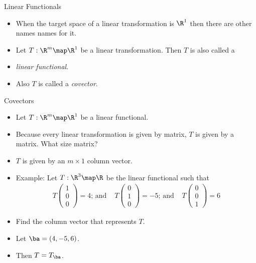 \documentclass{beamer}
\begin{document}
\begin{frame}{Linear Functionals}
\begin{itemize}
\item When the target space of a linear transformation is $\R^1$ then there
are other names names for it.
\item Let $T:\R^m\map\R^1$ be a linear transformation. Then $T$ is also called a
\item \emph{linear functional}.
\item Also $T$ is called a \emph{covector}.
\end{itemize}
\end{frame}


\begin{frame}{Covectors}
\begin{itemize}
\item Let $T:\R^m\map\R^1$ be a linear functional.
\item Because every linear transformation is given by matrix, $T$ is given
by a matrix. What size matrix?
\item $T$ is given by an $m\times 1$ column vector.
\item Example: Let $T:\R^3\map\R$ be the linear functional such that
$$
\begin{matrix}
T\begin{pmatrix} 1 \\ 0 \\ 0  \end{pmatrix} = 4
\text{; and }
&
T\begin{pmatrix} 0 \\ 1 \\ 0  \end{pmatrix} = -5
\text{; and }
&
T \begin{pmatrix} 0 \\ 0 \\ 1  \end{pmatrix} = 6
\end{matrix}
$$
\item Find the column vector that represents $T$.
\item Let $\ba = (4, -5, 6)$.
\item Then $T = T_{\ba}$.
\end{itemize}
\end{frame}

\end{document}
